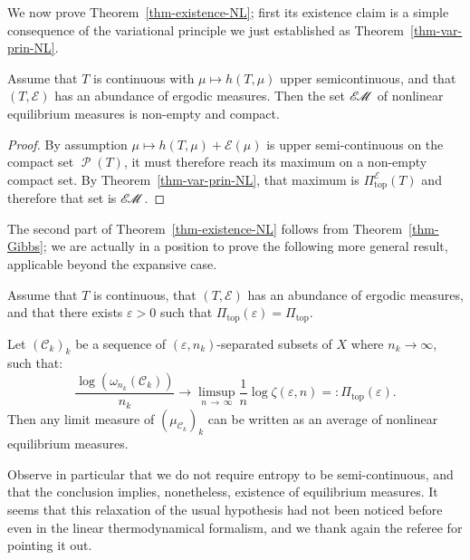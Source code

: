 \documentclass[AHL, Unicode, longabstracts,published]{cedram}
\theoremstyle{plain}
\theoremstyle{plain}
\newcommand\eps{\varepsilon}
\newcommand\NLP{\Pi}
\renewcommand\top{{\mathrm{top}}}
\newcommand\Prob{{\operatorname{\mathscr{P}}}}
\newcommand{\EM}{\mathscr{E\kern-2pt M}}
\newcommand*\8{\infty}
\newcommand{\En}{\mathcal{E}}
\newcommand{\cC}{\mathcal C}
\begin{document}
We now prove Theorem~\ref{thm-existence-NL}; first its existence claim is a simple consequence of the variational principle we just established as Theorem~\ref{thm-var-prin-NL}.

\begin{lemm}\label{lemm-existence}
Assume that $T$ is continuous with $\mu\mapsto h(T,\mu)$ upper semi\-conti\-nuous, and that $(T,\En)$ has an abundance of ergodic measures. Then the set $\EM$ of nonlinear equilibrium measures is non-empty and compact.
\end{lemm}

\begin{proof}
By assumption $\mu\mapsto h(T,\mu)+\En(\mu)$ is upper semi-continuous on the compact set $\Prob(T)$, it must therefore reach its maximum on a non-empty compact set. By Theorem~\ref{thm-var-prin-NL}, that maximum is $\NLP^\En_\top(T)$ and therefore that set is $\EM$.
\end{proof}

The second part of Theorem~\ref{thm-existence-NL} follows from Theorem~\ref{thm-Gibbs}; we are actually in a position to prove the following more general result, applicable beyond the expansive case.


\begin{theo}\label{thm-weak-Gibbs}
Assume that $T$ is continuous, that $(T,\En)$ has an abundance of ergodic measures, and that there exists $\eps>0$ such that $\NLP_\top(\varepsilon) = \NLP_\top$.

Let $(\cC_k)_k$ be a sequence of $(\varepsilon,n_k)$-separated subsets of $X$ where $n_k\to\infty$, such that:
\begin{equation}
\frac{\log(\omega_{n_k}(\cC_k))}{n_k} \to \limsup_{n\,\to\,\infty}\frac1n\log\zeta(\eps,n) =:\NLP_\top(\varepsilon).\label{eq-aGibbs}
\end{equation}
Then any limit measure of $(\mu_{\cC_k})_k$ can be written as an average of nonlinear equilibrium measures.
\end{theo}

Observe in particular that we do not require entropy to be semi-continuous, and that the conclusion implies, nonetheless, existence of equilibrium measures. It seems that this relaxation of the usual hypothesis had not been noticed before even in the linear thermodynamical formalism, and we thank again the referee for pointing it out.
\end{document}
